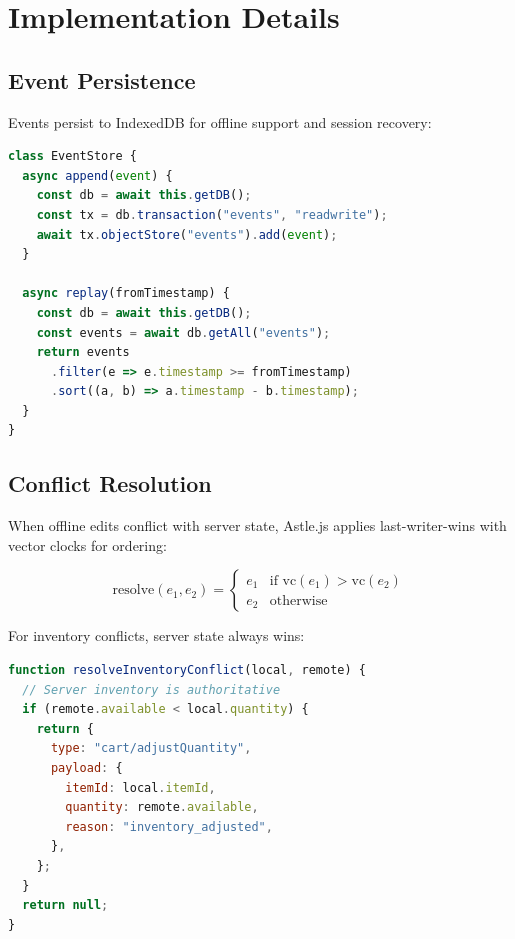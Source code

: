 \section{Implementation Details}


\subsection{Event Persistence}

Events persist to IndexedDB for offline support and session recovery:

\begin{lstlisting}[language=JavaScript,caption=IndexedDB persistence]
class EventStore {
  async append(event) {
    const db = await this.getDB();
    const tx = db.transaction("events", "readwrite");
    await tx.objectStore("events").add(event);
  }

  async replay(fromTimestamp) {
    const db = await this.getDB();
    const events = await db.getAll("events");
    return events
      .filter(e => e.timestamp >= fromTimestamp)
      .sort((a, b) => a.timestamp - b.timestamp);
  }
}
\end{lstlisting}

\subsection{Conflict Resolution}

When offline edits conflict with server state, Astle.js applies last-writer-wins with vector clocks for ordering:

\begin{equation}
\text{resolve}(e_1, e_2) = \begin{cases}
e_1 & \text{if } \text{vc}(e_1) > \text{vc}(e_2) \\
e_2 & \text{otherwise}
\end{cases}
\end{equation}

For inventory conflicts, server state always wins:

\begin{lstlisting}[language=JavaScript,caption=Inventory conflict resolution]
function resolveInventoryConflict(local, remote) {
  // Server inventory is authoritative
  if (remote.available < local.quantity) {
    return {
      type: "cart/adjustQuantity",
      payload: {
        itemId: local.itemId,
        quantity: remote.available,
        reason: "inventory_adjusted",
      },
    };
  }
  return null;
}
\end{lstlisting}

